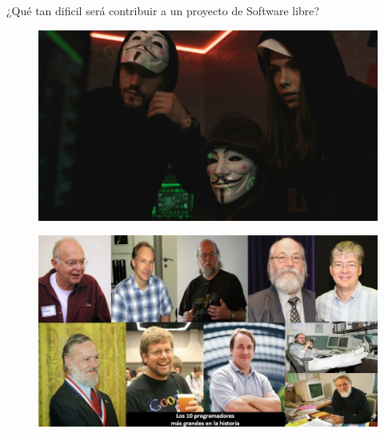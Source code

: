 \documentclass{beamer}
\begin{document}
\begin{frame}
  \centering
    \Huge ¿Qué tan dificil será contribuir a un proyecto de Software libre?
\end{frame}

\begin{frame}
	\begin{figure}
		\centering
		\includegraphics[width=1\linewidth]{images/hackers.jpg}
		\label{fig:debian}
	\end{figure}
\end{frame}

\begin{frame}
	\begin{figure}
		\centering
		\includegraphics[width=1\linewidth]{images/coders.jpg}
		\label{fig:debian}
	\end{figure}
\end{frame}
\end{document}
